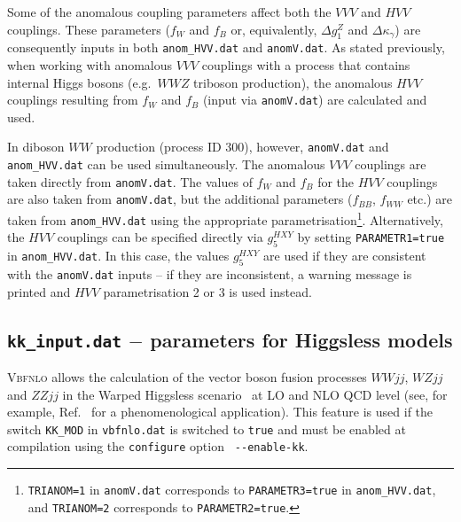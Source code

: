 \documentclass[english,12pt]{article}
\begin{document}
Some of the anomalous coupling parameters affect both the $VVV$ and $HVV$ couplings.  
These parameters ($f_{W}$ and $f_{B}$ or, equivalently, $\Delta g_{1}^{Z}$ and 
$\Delta \kappa_{\gamma}$) are consequently inputs in both {\tt anom\_HVV.dat} 
and {\tt anomV.dat}.  As stated previously, when working with anomalous $VVV$ 
couplings with a process that contains internal Higgs bosons (e.g.\ $WWZ$ triboson production), 
the anomalous $HVV$ couplings resulting from $f_{W}$ and $f_{B}$ (input 
via {\tt anomV.dat}) are calculated and used.

In diboson $WW$ production (process ID 300), however, {\tt anomV.dat} and {\tt anom\_HVV.dat} 
can be used simultaneously.  The anomalous $VVV$ couplings are taken directly from {\tt anomV.dat}.  
The values of $f_{W}$ and $f_{B}$ for the $HVV$ couplings are also taken from {\tt anomV.dat}, 
but the additional parameters ($f_{BB}$, $f_{WW}$ etc.) are taken from {\tt anom\_HVV.dat} 
using the appropriate parametrisation\footnote{{\tt TRIANOM=1} in {\tt anomV.dat} corresponds 
to {\tt PARAMETR3=true} in {\tt anom\_HVV.dat}, and {\tt TRIANOM=2} corresponds to {\tt PARAMETR2=true}.}. 
 Alternatively, the $HVV$ couplings can be specified directly via $g_{5}^{HXY}$ by setting 
{\tt PARAMETR1=true} in {\tt anom\_HVV.dat}.  In this case, the values $g_{5}^{HXY}$ are used if 
they are consistent with the {\tt anomV.dat} inputs -- if they are inconsistent, a warning message 
is printed and $HVV$ parametrisation 2 or 3 is used instead.




\subsection{{\tt kk\_input.dat} $-$ parameters for Higgsless models}

\textsc{Vbfnlo} allows the calculation of the vector boson fusion processes
$WWjj$, $WZjj$ and $ZZjj$ in the Warped Higgsless scenario~\cite{Csaki:2003zu,
Englert:2008wp} at LO and NLO QCD level (see, for example,
Ref.~\cite{Englert:2008tn} for a phenomenological application). This feature is
used if the switch {\tt KK\_MOD} in {\tt vbfnlo.dat} is switched to {\tt true}
and must be enabled at compilation using the {\tt configure} option {\tt
-{}-enable-kk}.
\end{document}
